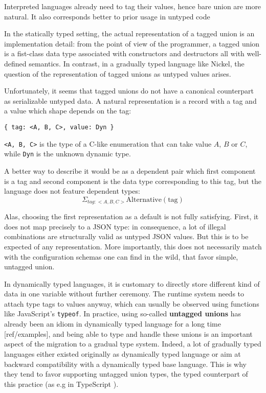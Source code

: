 \documentclass{article}
\begin{document}
Interpreted languages already need to tag their values, hence bare union are more natural.
It also corresponds better to prior usage in untyped code\vspace{0.5cm}\color{black}

In the statically typed setting, the actual representation of a tagged union is
an implementation detail: from the point of view of the programmer, a tagged
union is a fist-class data type associated with constructors and destructors all
with well-defined semantics. In contrast, in a gradually typed language like
Nickel, the question of the representation of tagged unions as untyped values
arises.

Unfortunately, it seems that tagged unions do not have a canonical counterpart
as serializable untyped data. A natural representation is a record with a tag
and a value which shape depends on the tag:

\begin{lstlisting}
{ tag: <A, B, C>, value: Dyn }
\end{lstlisting}

\lstinline+<A, B, C>+ is the type of a C-like enumeration that can take value
$A$, $B$ or $C$, while \lstinline+Dyn+ is the unknown dynamic type.

A better way to describe it would be as a dependent pair which first component
is a tag and second component is the data type corresponding to this tag, but
the language does not feature dependent types:
\[
    \Sigma_{tag : <A, B, C>} \text{Alternative}(\text{tag})
\]

Alas, choosing the first representation as a default is not fully satisfying.
First, it does not map precisely to a JSON type: in consequence, a lot of
illegal combinations are structurally valid as untyped JSON values. But this is
to be expected of any representation. More importantly, this does not
necessarily match with the configuration schemas one can find in the wild, that
favor simple, untagged union.

In dynamically typed languages, it is customary to directly store different kind
of data in one variable without further ceremony. The runtime system needs to
attach type tags to values anyway, which can usually be observed using functions
like JavaScript's \verb+typeof+. In practice, using so-called \textbf{untagged
unions} has already been an idiom in dynamically typed language for a long time
[ref/examples], and being able to type and handle these unions is an important
aspect of the migration to a gradual type system. Indeed, a lot of gradually
typed languages either existed originally as dynamically typed language or aim
at backward compatibility with a dynamically typed base language. This is why
they tend to favor supporting untagged union types, the typed counterpart of
this practice (as e.g in TypeScript \cite{TypeScriptUnions}).
\end{document}
